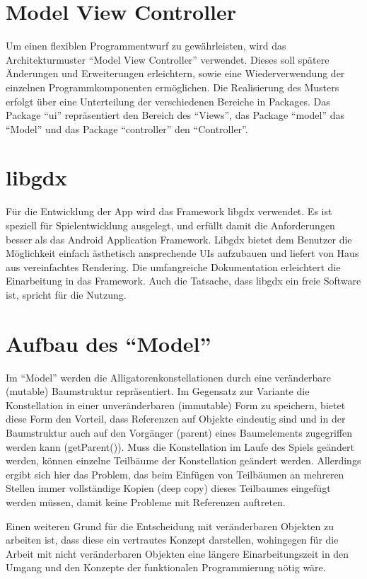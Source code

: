 \section{Model View Controller}
Um einen flexiblen Programmentwurf zu gewährleisten, wird das Architekturmuster "`Model View Controller"' verwendet.
Dieses soll spätere Änderungen und Erweiterungen erleichtern, sowie eine Wiederverwendung der einzelnen Programmkomponenten ermöglichen.
Die Realisierung des Musters erfolgt über eine Unterteilung der verschiedenen Bereiche in Packages.
 Das Package "`ui"' repräsentiert den Bereich des "`Views"', das Package "`model"' das "`Model"' und das Package "`controller"' den "`Controller"'.


\section{libgdx}
Für die Entwicklung der App wird das Framework libgdx verwendet.
Es ist speziell für Spielentwicklung ausgelegt, und erfüllt damit die Anforderungen besser als das Android Application Framework.
 Libgdx bietet dem Benutzer die Möglichkeit einfach ästhetisch ansprechende UIs aufzubauen und liefert von Haus aus vereinfachtes Rendering.
Die umfangreiche Dokumentation erleichtert die Einarbeitung in das Framework.
Auch die Tatsache, dass libgdx ein freie Software ist, spricht für die Nutzung.

\section{Aufbau des "`Model"'}
Im "`Model"' werden die Alligatorenkonstellationen durch eine veränderbare (mutable) Baumstruktur repräsentiert.
 Im Gegensatz zur Variante die Konstellation in einer unveränderbaren (immutable) Form zu speichern, bietet diese Form den Vorteil, dass Referenzen auf Objekte eindeutig sind und in der Baumstruktur auch auf den Vorgänger (parent) eines Baumelements zugegriffen werden kann (getParent()).
Muss die Konstellation im Laufe des Spiels geändert werden, können einzelne Teilbäume der Konstellation geändert werden.
Allerdings ergibt sich hier das Problem, das beim Einfügen von Teilbäumen an mehreren Stellen immer vollständige Kopien (deep copy) dieses Teilbaumes eingefügt werden müssen, damit keine Probleme mit Referenzen auftreten.

Einen weiteren Grund für die Entscheidung mit veränderbaren Objekten zu arbeiten ist, dass diese ein vertrautes Konzept darstellen, wohingegen für die Arbeit mit nicht veränderbaren Objekten eine längere Einarbeitungszeit in den Umgang und den Konzepte der funktionalen Programmierung nötig wäre.


